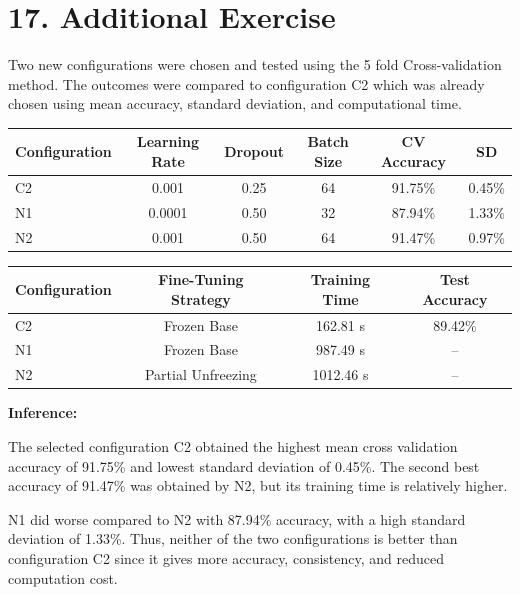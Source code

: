 \documentclass[10pt]{article}
\begin{document}
\section*{17. Additional Exercise}

Two new configurations were chosen and tested using the 5 fold
Cross-validation method. The outcomes were compared to configuration
C2 which was already chosen using mean accuracy, standard deviation,
and computational time.

\begin{center}

\begin{tabular}{|l|c|c|c|c|c|}
\hline
Configuration & Learning Rate & Dropout & Batch Size &
CV Accuracy & SD \\
\hline
C2 & 0.001 & 0.25 & 64 & 91.75\% & 0.45\% \\
N1 & 0.0001 & 0.50 & 32 & 87.94\% & 1.33\% \\
N2 & 0.001 & 0.50 & 64 & 91.47\% & 0.97\% \\
\hline
\end{tabular}

\end{center}

\begin{center}

\begin{tabular}{|l|c|c|c|}
\hline
Configuration & Fine-Tuning Strategy & Training Time & Test Accuracy \\
\hline
C2 & Frozen Base & 162.81 s & 89.42\% \\
N1 & Frozen Base & 987.49 s & -- \\
N2 & Partial Unfreezing & 1012.46 s & -- \\
\hline
\end{tabular}

\end{center}

\textbf{Inference:}

The selected configuration C2 obtained the highest mean cross validation accuracy
of 91.75\% and lowest standard deviation of 0.45\%. The second best accuracy 
of 91.47\% was obtained by N2, but its training time is relatively higher.

N1 did worse compared to N2 with 87.94\% accuracy, with a high standard deviation of 1.33\%. Thus, neither of the two configurations is better than configuration C2 since it gives more accuracy, consistency, and reduced computation cost.
\end{document}
